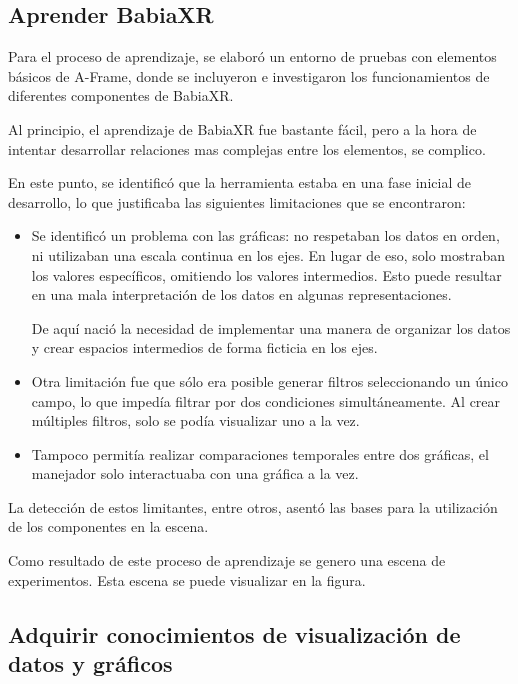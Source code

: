 \documentclass[a4paper, 12pt]{book}
\begin{document}
            \subsection{Aprender BabiaXR}

            Para el proceso de aprendizaje, se elaboró un entorno de pruebas con elementos básicos de A-Frame, donde se incluyeron e investigaron los funcionamientos de diferentes componentes de BabiaXR.
            
            Al principio, el aprendizaje de BabiaXR fue bastante fácil, pero a la hora de intentar desarrollar relaciones mas complejas entre los elementos, se complico.

            En este punto, se identificó que la herramienta estaba en una fase inicial de desarrollo, lo que justificaba las siguientes limitaciones que se encontraron: 
            \begin{itemize}
                \item Se identificó un problema con las gráficas: no respetaban los datos en orden, ni utilizaban una escala continua en los ejes. En lugar de eso, solo mostraban los valores específicos, omitiendo los valores intermedios. Esto puede resultar en una mala interpretación de los datos en algunas representaciones.

                De aquí nació la necesidad de implementar una manera de organizar los datos y crear espacios intermedios de forma ficticia en los ejes.
                \item Otra limitación fue que sólo era posible generar filtros seleccionando un único campo, lo que impedía filtrar por dos condiciones simultáneamente. Al crear múltiples filtros, solo se podía visualizar uno a la vez. 
                \item Tampoco permitía realizar comparaciones temporales entre dos gráficas, el manejador solo interactuaba con una gráfica a la vez.
            \end{itemize}
            
            

            
            

            La detección de estos limitantes, entre otros, asentó las bases para la utilización de los componentes en la escena.

            Como resultado de este proceso de aprendizaje se genero una escena de experimentos. Esta escena se puede visualizar en la figura.


            \subsection{Adquirir conocimientos de visualización de datos y gráficos}
            
\end{document}
